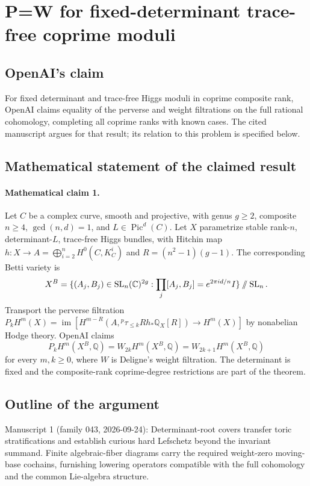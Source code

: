 \documentclass[11pt]{article}
\begin{document}
\section*{P=W for fixed-determinant trace-free coprime moduli}

\subsection{OpenAI's claim}
For fixed determinant and trace-free Higgs moduli in coprime composite rank, OpenAI claims equality of the perverse and weight filtrations on the full rational cohomology, completing all coprime ranks with known cases. The cited manuscript argues for that result; its relation to this problem is specified below.

\subsection{Mathematical statement of the claimed result}
\paragraph{Mathematical claim 1.} Let $C$ be a complex curve, smooth and projective, with genus $g\ge2$, composite $n\ge4$, $\gcd(n,d)=1$, and $L\in\operatorname{Pic}^d(C)$. Let $X$ parametrize stable rank-$n$, determinant-$L$, trace-free Higgs bundles, with Hitchin map $h:X\to A=\bigoplus_{i=2}^nH^0(C,K_C^i)$ and $R=(n^2-1)(g-1)$. The corresponding Betti variety is
\[
X^B=\{(A_j,B_j)\in\operatorname{SL}_n(\mathbb C)^{2g}:\prod_j[A_j,B_j]=e^{2\pi id/n}I\}\mathbin{/\mkern-6mu/}\operatorname{SL}_n.
\]
Transport the perverse filtration $P_kH^m(X)=\operatorname{im}[H^{m-R}(A,{}^p\tau_{\le k}Rh_*\mathbb Q_X[R])\to H^m(X)]$ by nonabelian Hodge theory. OpenAI claims
\[
P_kH^m(X^B,\mathbb Q)=W_{2k}H^m(X^B,\mathbb Q)=W_{2k+1}H^m(X^B,\mathbb Q)
\]
for every $m,k\ge0$, where $W$ is Deligne's weight filtration. The determinant is fixed and the composite-rank coprime-degree restrictions are part of the theorem.

\subsection{Outline of the argument}
Manuscript 1 (family 043, 2026-09-24): Determinant-root covers transfer toric stratifications and establish curious hard Lefschetz beyond the invariant summand. Finite algebraic-fiber diagrams carry the required weight-zero moving-base cochains, furnishing lowering operators compatible with the full cohomology and the common Lie-algebra structure.
\end{document}
